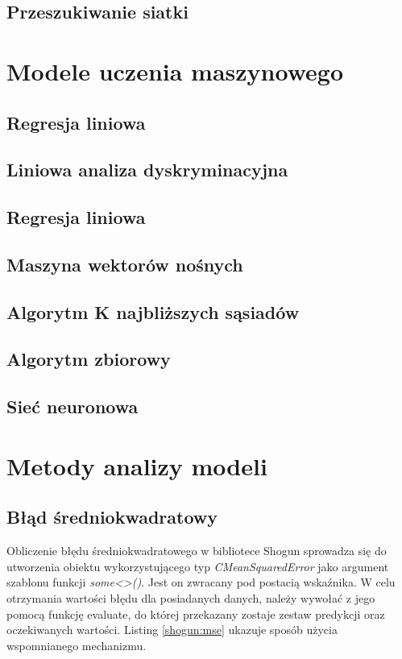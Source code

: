 \subsection{Przeszukiwanie siatki}

\section{Modele uczenia maszynowego}

\subsection{Regresja liniowa}
\subsection{Liniowa analiza dyskryminacyjna}
\subsection{Regresja liniowa}
\subsection{Maszyna wektorów nośnych}
\subsection{Algorytm K najbliższych sąsiadów}
\subsection{Algorytm zbiorowy}
\subsection{Sieć neuronowa}

\section{Metody analizy modeli}

\subsection{Błąd średniokwadratowy}

Obliczenie błędu średniokwadratowego w bibliotece Shogun sprowadza się do utworzenia obiektu wykorzystującego typ \textit{CMeanSquaredError} jako argument szablonu funkcji \textit{some<>()}. Jest on zwracany pod postacią wskaźnika. W celu otrzymania wartości błędu dla posiadanych danych, należy wywołać z jego pomocą funkcję evaluate, do której przekazany zostaje zestaw predykcji oraz oczekiwanych wartości. Listing \ref{shogun:mse} ukazuje sposób użycia wspomnianego mechanizmu.

